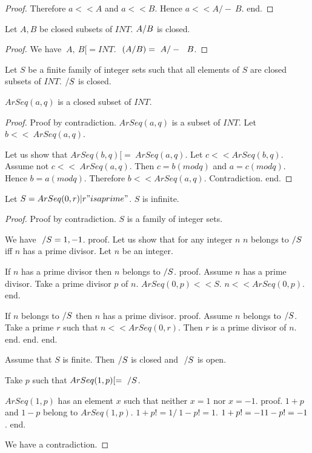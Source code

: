\documentclass{document}
\begin{document}
\begin{forthel}
\begin{proof}
        Therefore $a << A$ and $a << B$. Hence $a << A /-\ B$.
      end.
    \end{proof}

    \begin{lemma}[UnionClosed]
      Let $A,B$ be closed subsets of $INT$. $A \-/ B$ is closed.
    \end{lemma}
    \begin{proof}
      We have $~A,~B [= INT$. $~(A \-/ B) = ~A /-\ ~B$.
    \end{proof}

    \begin{axiom}[UnionSClosed]
      Let $S$ be a finite family of integer sets such that all elements of $S$ are closed subsets of $INT$. $\-/ S$ is closed.
    \end{axiom}

    \begin{lemma}[ArSeqClosed]
      $ArSeq(a,q)$ is a closed subset of $INT$.
    \end{lemma}
    \begin{proof}
      Proof by contradiction. $ArSeq(a,q)$ is a subset of $INT$. Let $b << ~ArSeq (a,q)$.

      Let us show that $ArSeq(b,q) [= ~ArSeq(a,q)$. Let $c << ArSeq(b,q)$.
        Assume not $c << ~ArSeq(a,q)$. Then $c = b (mod q)$ and $a = c (mod q)$. Hence $b = a (mod q)$. Therefore $b << ArSeq(a,q)$. Contradiction.
      end.
    \end{proof}

    \begin{theorem}[Fuerstenberg]
      Let $S = {ArSeq(0,r) | r "is a prime"}$. $S$ is infinite.
    \end{theorem}
    \begin{proof}
      Proof by contradiction. $S$ is a family of integer sets.

      We have $~ \-/ S = {1, -1}$.
      proof.
        Let us show that for any integer $n$ $n$ belongs to $\-/ S$ iff $n$ has a prime divisor.
          Let $n$ be an integer.

          If $n$ has a prime divisor then $n$ belongs to $\-/ S$.
          proof.
            Assume $n$ has a prime divisor. Take a prime divisor $p$ of $n$. $ArSeq(0,p) << S$. $n << ArSeq(0,p)$.
          end.

          If $n$ belongs to $\-/ S$ then $n$ has a prime divisor.
          proof.
            Assume $n$ belongs to $\-/S$. Take a prime $r$ such that $n << ArSeq(0,r)$. Then $r$ is a prime divisor of $n$.
          end.
        end.
      end.

      Assume that $S$ is finite. Then $\-/ S$ is closed and $~ \-/ S$ is open.

      Take $p$ such that $ArSeq(1,p) [= ~ \-/ S$.

      $ArSeq(1,p)$ has an element $x$ such that neither $x = 1$ nor $x = -1$.
      proof.
        $1 + p$ and $1 - p$ belong to $ArSeq(1,p)$. $1 + p !=  1 /\ 1 - p !=  1$. $1 + p != -1 \/ 1 - p != -1$.
      end.

      We have a contradiction.
    \end{proof}
  \end{forthel}
\end{document}
